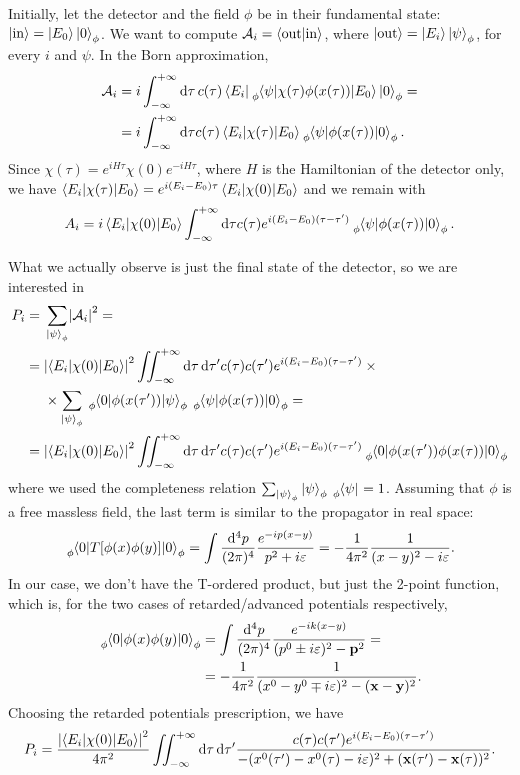 \documentclass[a4paper,12pt]{book}
\DeclarePairedDelimiter{\abs}{\lvert}{\rvert}
\renewcommand{\vec}{\mathbf}
\newcommand{\dd}{\mathop{\mathrm{d}\!}{}}
\renewcommand{\epsilon}{\varepsilon}
\theoremstyle{definition}
\theoremstyle{remark}
\begin{document}
Initially, let the detector and the field $\phi$ be in their fundamental state: $\ket{\text{in}}=\ket{E_0}\ket{0}_\phi$. We want to compute $\mathcal A_i=\braket{\text{out}|\text{in}}$, where $\ket{\text{out}}=\ket{E_i}\ket{\psi}_\phi$, for every $i$ and $\psi$. In the Born approximation,
\begin{align*}
\mathcal A_i&=i\int_{-\infty}^{+\infty}\dd\tau\,c(\tau) \bra{E_i}\!\tensor[_\phi]{\braket{\psi|\chi(\tau)\phi(x(\tau))|E_0}\ket{0}}{_\phi}=\\
&=i\int_{-\infty}^{+\infty}\dd\tau c(\tau)\braket{E_i|\chi(\tau)|E_0}\!\tensor[_\phi]{\braket{\psi|\phi(x(\tau))|0}}{_\phi}.
\end{align*}
Since $\chi(\tau)=e^{iH\tau}\chi(0)e^{-iH\tau}$, where $H$ is the Hamiltonian of the detector only, we have $\braket{E_i|\chi(\tau)|E_0}=e^{i(E_i-E_0)\tau}\braket{E_i|\chi(0)|E_0}$ and we remain with
\[A_i=i\braket{E_i|\chi(0)|E_0}\int_{-\infty}^{+\infty}\dd\tau c(\tau)e^{i(E_i-E_0)(\tau-\tau')}\tensor[_\phi]{\braket{\psi|\phi(x(\tau))|0}}{_\phi}.\]

What we actually observe is just the final state of the detector, so we are interested in
\begin{align*}
P_i={}&\sum_{\ket{\psi}_\phi}\abs*{\mathcal A_i}^2=\\
={}&\abs*{\braket{E_i|\chi(0)|E_0}}^2\iint_{-\infty}^{+\infty}\dd\tau\dd\tau'c(\tau)c(\tau')e^{i(E_i-E_0)(\tau-\tau')}\times{}\\
&\times\sum_{\ket{\psi}_\phi}\tensor[_\phi]{\braket{0|\phi(x(\tau'))|\psi}}{_\phi}\tensor[_\phi]{\braket{\psi|\phi(x(\tau))|0}}{_\phi}=\\
={}&\abs*{\braket{E_i|\chi(0)|E_0}}^2\iint_{-\infty}^{+\infty}\dd\tau\dd\tau'c(\tau)c(\tau')e^{i(E_i-E_0)(\tau-\tau')}\tensor[_\phi]{\braket{0|\phi(x(\tau'))\phi(x(\tau))|0}}{_\phi}
\end{align*}
where we used the completeness relation $\sum_{\ket{\psi}_\phi}\ket{\psi}_\phi\tensor[_\phi]{\bra{\psi}}{}=1$. Assuming that $\phi$ is a free massless field, the last term is similar to the propagator in real space:
\[\tensor[_\phi]{\braket{0|T[\phi(x)\phi(y)]|0}}{_\phi}=\int\frac{\dd^4p}{(2\pi)^4}\frac{e^{-ip(x-y)}}{p^2+i\epsilon}=-\frac1{4\pi^2}\frac1{(x-y)^2-i\epsilon}.\]
In our case, we don't have the T-ordered product, but just the 2-point function, which is, for the two cases of retarded/advanced potentials respectively,
\begin{align*}
\tensor[_\phi]{\braket{0|\phi(x)\phi(y)|0}}{_\phi}&=\int\frac{\dd^4p}{(2\pi)^4}\frac{e^{-ik(x-y)}}{(p^0\pm i\epsilon)^2-\vec p^2}=\\
&=-\frac1{4\pi^2}\frac1{(x^0-y^0\mp i\epsilon)^2-(\vec x-\vec y)^2}.
\end{align*}
Choosing the retarded potentials prescription, we have
\[P_i=\frac{\abs*{\braket{E_i|\chi(0)|E_0}}^2}{4\pi^2}\iint_{-\infty}^{+\infty}\dd\tau\dd\tau'\frac{c(\tau)c(\tau')e^{i(E_i-E_0)(\tau-\tau')}}{-(x^0(\tau')-x^0(\tau)-i\epsilon)^2+(\vec x(\tau')-\vec x(\tau))^2}.\]
\end{document}
